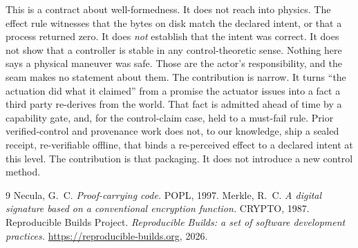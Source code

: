 \documentclass[11pt]{article}
\begin{document}
This is a contract about well-formedness. It does not reach into physics. The effect rule witnesses that the bytes on disk match the declared intent, or that a process returned zero. It does \emph{not} establish that the intent was correct. It does not show that a controller is stable in any control-theoretic sense. Nothing here says a physical maneuver was safe. Those are the actor's responsibility, and the seam makes no statement about them. The contribution is narrow. It turns ``the actuation did what it claimed'' from a promise the actuator issues into a fact a third party re-derives from the world. That fact is admitted ahead of time by a capability gate, and, for the control-claim case, held to a must-fail rule. Prior verified-control and provenance work does not, to our knowledge, ship a sealed receipt, re-verifiable offline, that binds a re-perceived effect to a declared intent at this level. The contribution is that packaging. It does not introduce a new control method.

\begin{thebibliography}{9}
\small
{} Necula, G.~C. \emph{Proof-carrying code.} POPL, 1997.
 Merkle, R.~C. \emph{A digital signature based on a conventional encryption function.} CRYPTO, 1987.
 Reproducible Builds Project. \emph{Reproducible Builds: a set of software development practices.} \url{https://reproducible-builds.org}, 2026.
\end{thebibliography}
\end{document}
